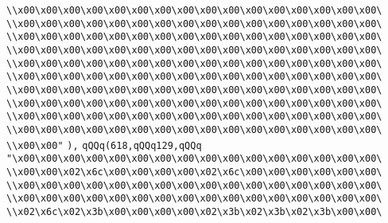 \verb|\\x00\x00\x00\x00\x00\x00\x00\x00\x00\x00\x00\x00\x00\x00\x00\x00\|\newline
\verb|\\x00\x00\x00\x00\x00\x00\x00\x00\x00\x00\x00\x00\x00\x00\x00\x00\|\newline
\verb|\\x00\x00\x00\x00\x00\x00\x00\x00\x00\x00\x00\x00\x00\x00\x00\x00\|\newline
\verb|\\x00\x00\x00\x00\x00\x00\x00\x00\x00\x00\x00\x00\x00\x00\x00\x00\|\newline
\verb|\\x00\x00\x00\x00\x00\x00\x00\x00\x00\x00\x00\x00\x00\x00\x00\x00\|\newline
\verb|\\x00\x00\x00\x00\x00\x00\x00\x00\x00\x00\x00\x00\x00\x00\x00\x00\|\newline
\verb|\\x00\x00\x00\x00\x00\x00\x00\x00\x00\x00\x00\x00\x00\x00\x00\x00\|\newline
\verb|\\x00\x00\x00\x00\x00\x00\x00\x00\x00\x00\x00\x00\x00\x00\x00\x00\|\newline
\verb|\\x00\x00\x00\x00\x00\x00\x00\x00\x00\x00\x00\x00\x00\x00\x00\x00\|\newline
\verb|\\x00\x00\x00\x00\x00\x00\x00\x00\x00\x00\x00\x00\x00\x00\x00\x00\|\newline
\verb|\\x00\x00"|\newline
\verb|),|\newline
\verb|qQQq(618,qQQq129,qQQq|\newline
\verb|"\x00\x00\x00\x00\x00\x00\x00\x00\x00\x00\x00\x00\x00\x00\x00\x00\|\newline
\verb|\\x00\x00\x02\x6c\x00\x00\x00\x00\x02\x6c\x00\x00\x00\x00\x00\x00\|\newline
\verb|\\x00\x00\x00\x00\x00\x00\x00\x00\x00\x00\x00\x00\x00\x00\x00\x00\|\newline
\verb|\\x00\x00\x00\x00\x00\x00\x00\x00\x00\x00\x00\x00\x00\x00\x00\x00\|\newline
\verb|\\x02\x6c\x02\x3b\x00\x00\x00\x00\x02\x3b\x02\x3b\x02\x3b\x00\x00\|\newline
